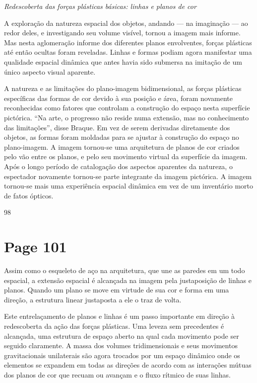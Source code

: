 \documentclass[a4paper]{article}
\begin{document}
{\large\itshape Redescoberta das forças plásticas básicas: linhas e planos de cor}

A exploração da natureza espacial dos objetos, andando --- na imaginação --- ao redor deles, e investigando seu volume visível, tornou a imagem mais informe. Mas nesta aglomeração informe dos diferentes planos envolventes, forças plásticas até então ocultas foram reveladas. Linhas e formas podiam agora manifestar uma qualidade espacial dinâmica que antes havia sido submersa na imitação de um único aspecto visual aparente.

A natureza e as limitações do plano-imagem bidimensional, as forças plásticas específicas das formas de cor devido à sua posição e área, foram novamente reconhecidas como fatores que controlam a construção do espaço nesta superfície pictórica. ``Na arte, o progresso não reside numa extensão, mas no conhecimento das limitações'', disse Braque. Em vez de serem derivadas diretamente dos objetos, as formas foram moldadas para se ajustar à construção do espaço no plano-imagem. A imagem tornou-se uma arquitetura de planos de cor criados pelo vão entre os planos, e pelo seu movimento virtual da superfície da imagem. Após o longo período de catalogação dos aspectos aparentes da natureza, o espectador novamente tornou-se parte integrante da imagem pictórica. A imagem tornou-se mais uma experiência espacial dinâmica em vez de um inventário morto de fatos ópticos.

98

\newpage
\section*{Page 101}

Assim como o esqueleto de aço na arquitetura, que une as paredes em um todo espacial, a extensão espacial é alcançada na imagem pela justaposição de linhas e planos. Quando um plano se move em virtude de sua cor e forma em uma direção, a estrutura linear justaposta a ele o traz de volta.

Este entrelaçamento de planos e linhas é um passo importante em direção à redescoberta da ação das forças plásticas. Uma leveza sem precedentes é alcançada, uma estrutura de espaço aberto na qual cada movimento pode ser seguido claramente. A massa dos volumes tridimensionais e seus movimentos gravitacionais unilaterais são agora trocados por um espaço dinâmico onde os elementos se expandem em todas as direções de acordo com as interações mútuas dos planos de cor que recuam ou avançam e o fluxo rítmico de suas linhas.
\end{document}
